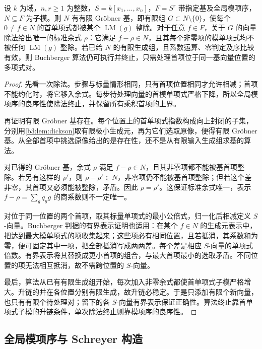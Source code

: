 \begin{proposition}\label{b3:prop:module-groebner-algorithm}
	设 \(k\) 为域，\(n,r\ge1\) 为整数，\(S=k[x_1,\ldots,x_n]\)，\(F=S^r\) 带指定基及全局模项序，\(N\subseteq F\) 为子模。则 \(N\) 有有限 Gröbner 基，即有限组 \(G\subset N\setminus\{0\}\)，使每个 \(0\ne f\in N\) 的首单项式都被某个 \(\operatorname{LM}(g)\) 整除。对于任意 \(f\in F\)，关于 \(G\) 的向量除法给出唯一的标准余式 \(\rho\)：它满足 \(f-\rho\in N\)，且其每个非零项的模单项式均不被任何 \(\operatorname{LM}(g)\) 整除。若已给 \(N\) 的有限生成组，且系数运算、零判定及序比较有效，则 Buchberger 算法仍可执行并终止，只需处理首项位于同一基向量位置的多项式对。
\end{proposition}
\begin{proof}
	先看一次除法。步骤与标量情形相同，只有首项位置相同才允许相减；首项不能约化时，将它移入余式。每步待处理向量的首模单项式严格下降，所以全局模项序的良序性使除法终止，并保留所有乘积首项的上界。

	再证明有限 Gröbner 基存在。每个位置上的首单项式指数构成向上封闭的子集，分别用\cref{b3:lem:dickson}取有限极小生成元，再为它们选取原像，便得有限 Gröbner 基。从全部首项中挑选原像给出的是存在性，还不是从有限输入生成组求基的算法。

	对已得的 Gröbner 基，余式 \(\rho\) 满足 \(f-\rho\in N\)，且其非零项都不能被基首项整除。若另有这样的 \(\rho'\)，则 \(\rho-\rho'\in N\)，非零项仍不能被基首项整除；但若这个差非零，其首项又必须能被整除，矛盾。因此 \(\rho=\rho'\)。这保证标准余式唯一，表示 \(f-\rho=\sum_gq_gg\) 的商系数则不一定唯一。

	对位于同一位置的两个首项，取其标量单项式的最小公倍式，归一化后相减定义 \(S\)-向量。Buchberger 判据的有界表示证明也适用：在某个 \(f\in N\) 的生成元表示中，把达到最大模单项式的项收集起来；这些项必有相同位置，且若抵消，其系数和为零，便可固定其中一项，把全部抵消写成两两差。每个差是相应 \(S\)-向量的单项式倍数。有界表示将其替换成更小首项的组合，与最大首项最小的选取矛盾。不同位置的项无法相互抵消，故不需跨位置的 \(S\)-向量。

	最后，算法从已有有限生成组开始，每次加入非零余式都使首单项式子模严格增大。升链的并在各位置分别有限生成，故升链必稳定。于是只添加有限个新向量，也只有有限个待处理对；留下的各 \(S\)-向量有界表示保证正确性。算法终止靠首单项式子模的升链条件，单次除法终止则靠模项序的良序性。
\end{proof}

\subsection{全局模项序与 Schreyer 构造}
\label{b3:subsec:2104:02}

